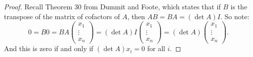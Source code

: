 \documentclass[10pt,oneside,reqno]{amsart}
\theoremstyle{plain}
\theoremstyle{definition}
\theoremstyle{remark}
\newcommand{\lpar}{\left(}
\newcommand{\rpar}{\right)}
\begin{document}
\begin{enumerate}[label=\arabic*.]
\begin{proof}
Recall Theorem 30 from Dummit and Foote, which states that if $B$ is the transpose of the matrix of cofactors of $A$, then $AB = BA = (\det A) I$. So note:
$$
0 = B0 = BA\lpar 
\begin{matrix}
x_1\\
\vdots\\
x_n
\end{matrix} \rpar = (\det A)I\lpar 
\begin{matrix}
x_1\\
\vdots\\
x_n
\end{matrix} \rpar = (\det A)\lpar 
\begin{matrix}
x_1\\
\vdots\\
x_n
\end{matrix} \rpar.
$$
And this is zero if and only if $(\det A)x_i = 0$ for all $i$. 
\end{proof}



\end{enumerate}
\end{document}
